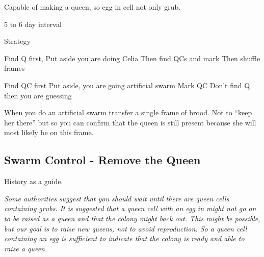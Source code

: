 Capable of making a queen, so egg in cell not only grub.

5 to 6 day interval

Strategy

Find Q first,
Put aside you are doing Celia
Then find QCs and mark
Then shuffle frames

Find QC first
Put aside, you are going artificial swarm
Mark QC
Don’t find Q then you are guessing
 
When you do an artificial swarm transfer a single frame of brood.  
Not to “keep her there” but so you can confirm that the queen is still present because she will most likely be on this frame.



\subsection{Swarm Control - Remove the Queen}

History as a guide.

\textit{Some authorities suggest that you should wait until 
there are queen cells containing grubs.
It is suggested that a queen cell with an egg in might not 
go on to be raised as a queen and that the colony might back out.
This might be possible, but our goal is to raise new queens,
not to avoid reproduction.
So a queen cell containing an egg is sufficient to indicate
that the colony is ready and able to raise a queen.}

